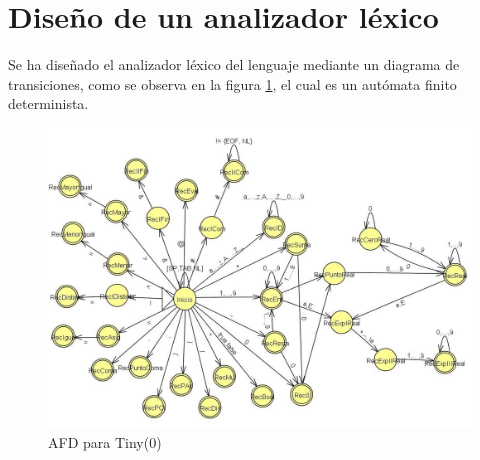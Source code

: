 \section{Diseño de un analizador léxico}

Se ha diseñado el analizador léxico del lenguaje mediante un diagrama de transiciones, como se observa en la figura \ref{fig:diagrama_afd}, el cual es un autómata finito determinista.\\

\begin{figure}[H]
    \centering
    \includegraphics[width=1\linewidth]{memoria/Secciones/Hito1/Tiny0/diagrama_afd.jpg}
    \caption{AFD para Tiny(0)}
    \label{fig:diagrama_afd}
\end{figure}